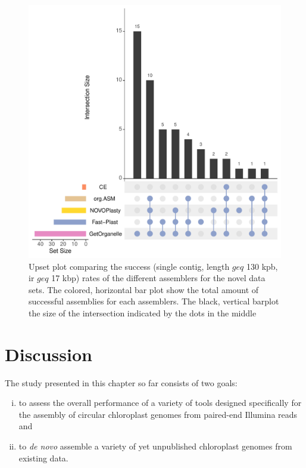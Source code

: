 \begin{figure}[H]
\centering
\includegraphics[height=.45\textheight, width=.95\textwidth]{Figures/upset_novel}
\decoRule
\caption[Upset plot comparing the success rates for novel data
sets]{Upset plot comparing the success (single contig, length $geq$
  130 kpb, ir $geq$ 17 kbp) rates of the different assemblers for the
  novel data sets. The colored, horizontal bar plot show the total
  amount of successful assemblies for each assemblers. The black,
  vertical barplot the size of the intersection indicated by the dots
  in the middle}
\label{fig:upset_novel}
\end{figure}

\section{Discussion} \label{dis_cp}

The study presented in this chapter so far consists of two goals:
\begin{enumerate}[(i)]
\item to assess the overall performance of a variety of tools designed specifically for
  the assembly of circular chloroplast genomes from paired-end Illumina reads and
\item to \textit{de novo} assemble a variety of yet unpublished chloroplast genomes from existing data.
\end{enumerate}

